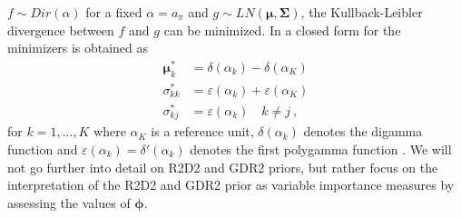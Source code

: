 $f\sim Dir(\alpha)$ for a fixed $\alpha = a_{\pi}$ and $g\sim LN(\boldsymbol{\mu}, \boldsymbol{\Sigma})$, the Kullback-Leibler divergence \citep{Kullback_Liebler_1951} between $f$ and $g$ can be minimized. In \citet{aguilar2024generalized} a closed form for the minimizers is obtained as 
\begin{equation}
    \begin{aligned}
    \boldsymbol{\mu}^*_k &= \delta(\alpha_k) - \delta(\alpha_K) \\ 
    \sigma_{kk}^* &= \varepsilon(\alpha_k) + \varepsilon(\alpha_K) \\  \sigma_{kj}^* &= \varepsilon(\alpha_k) \quad k \neq j\ ,
    \end{aligned}
\end{equation}
for $k=1, ..., K$ where $\alpha_K$ is a reference unit, $\delta(\alpha_k)$ denotes the digamma function and $\varepsilon(\alpha_k) = \delta'(\alpha_k)$ denotes the first polygamma function \citep[pages 258-260]{abramowitz1972handbook}. We will not go further into detail on R2D2 and GDR2 priors, but rather focus on the interpretation of the R2D2 and GDR2 prior as variable importance measures by assessing the values of $\boldsymbol{\phi}$.






